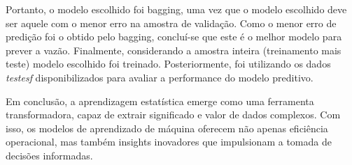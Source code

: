 \documentclass[11pt,]{article}
\begin{document}
\noindent Portanto, o modelo escolhido foi bagging, uma vez que o modelo
escolhido deve ser aquele com o menor erro na amostra de validação. Como
o menor erro de predição foi o obtido pelo bagging, concluí-se que este
é o melhor modelo para prever a vazão. Finalmente, considerando a
amostra inteira (treinamento mais teste) modelo escolhido foi treinado.
Posteriormente, foi utilizando os dados \textit{testesf}
disponibilizados para avaliar a performance do modelo preditivo.

Em conclusão, a aprendizagem estatística emerge como uma ferramenta
transformadora, capaz de extrair significado e valor de dados complexos.
Com isso, os modelos de aprendizado de máquina oferecem não apenas
eficiência operacional, mas também insights inovadores que impulsionam a
tomada de decisões informadas.





\newpage
\singlespacing 

\end{document}

